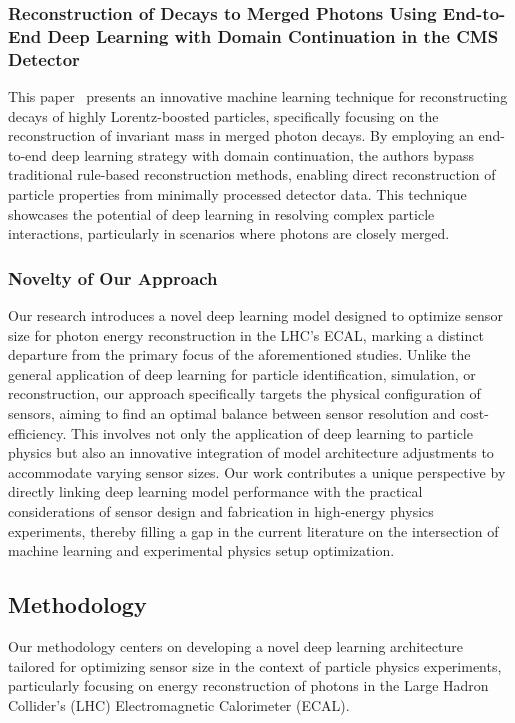 \documentclass[conference]{IEEEtran}
\begin{document}
\subsubsection{Reconstruction of Decays to Merged Photons Using End-to-End Deep Learning with Domain Continuation in the CMS Detector}

This paper~\cite{PhysRevD.108.052002} presents an innovative machine learning technique for reconstructing decays of highly Lorentz-boosted particles, specifically focusing on the reconstruction of invariant mass in merged photon decays. By employing an end-to-end deep learning strategy with domain continuation, the authors bypass traditional rule-based reconstruction methods, enabling direct reconstruction of particle properties from minimally processed detector data. This technique showcases the potential of deep learning in resolving complex particle interactions, particularly in scenarios where photons are closely merged.

\subsubsection{Novelty of Our Approach}

Our research introduces a novel deep learning model designed to optimize sensor size for photon energy reconstruction in the LHC's ECAL, marking a distinct departure from the primary focus of the aforementioned studies. Unlike the general application of deep learning for particle identification, simulation, or reconstruction, our approach specifically targets the physical configuration of sensors, aiming to find an optimal balance between sensor resolution and cost-efficiency. This involves not only the application of deep learning to particle physics but also an innovative integration of model architecture adjustments to accommodate varying sensor sizes. Our work contributes a unique perspective by directly linking deep learning model performance with the practical considerations of sensor design and fabrication in high-energy physics experiments, thereby filling a gap in the current literature on the intersection of machine learning and experimental physics setup optimization.

\subsection{Methodology}
\label{main_body:methodology}

Our methodology centers on developing a novel deep learning architecture tailored for optimizing sensor size in the context of particle physics experiments, particularly focusing on energy reconstruction of photons in the Large Hadron Collider's (LHC) Electromagnetic Calorimeter (ECAL).
\end{document}
